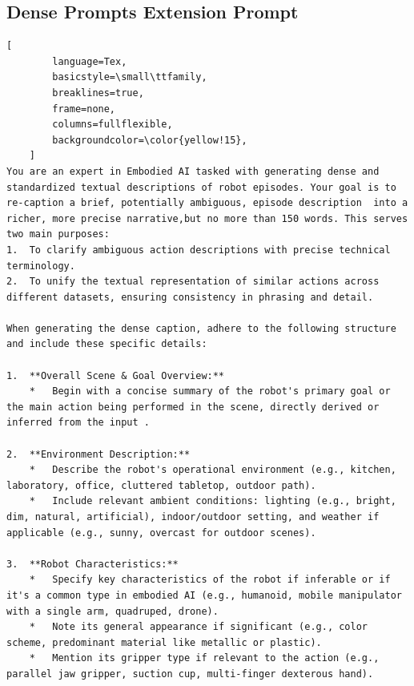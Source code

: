 
\centering

\begin{tcolorbox}[
    promptstyle, 
    width=\linewidth, 
    breakable
] 
    \subsection*{Dense Prompts Extension Prompt}

    \begin{lstlisting}[
        language=Tex, 
        basicstyle=\small\ttfamily,
        breaklines=true,
        frame=none, 
        columns=fullflexible,
        backgroundcolor=\color{yellow!15}, 
    ]
You are an expert in Embodied AI tasked with generating dense and standardized textual descriptions of robot episodes. Your goal is to re-caption a brief, potentially ambiguous, episode description  into a richer, more precise narrative,but no more than 150 words. This serves two main purposes:
1.  To clarify ambiguous action descriptions with precise technical terminology.
2.  To unify the textual representation of similar actions across different datasets, ensuring consistency in phrasing and detail.

When generating the dense caption, adhere to the following structure and include these specific details:

1.  **Overall Scene & Goal Overview:**
    *   Begin with a concise summary of the robot's primary goal or the main action being performed in the scene, directly derived or inferred from the input .

2.  **Environment Description:**
    *   Describe the robot's operational environment (e.g., kitchen, laboratory, office, cluttered tabletop, outdoor path).
    *   Include relevant ambient conditions: lighting (e.g., bright, dim, natural, artificial), indoor/outdoor setting, and weather if applicable (e.g., sunny, overcast for outdoor scenes).

3.  **Robot Characteristics:**
    *   Specify key characteristics of the robot if inferable or if it's a common type in embodied AI (e.g., humanoid, mobile manipulator with a single arm, quadruped, drone).
    *   Note its general appearance if significant (e.g., color scheme, predominant material like metallic or plastic).
    *   Mention its gripper type if relevant to the action (e.g., parallel jaw gripper, suction cup, multi-finger dexterous hand).


\end{lstlisting}
\end{tcolorbox}
